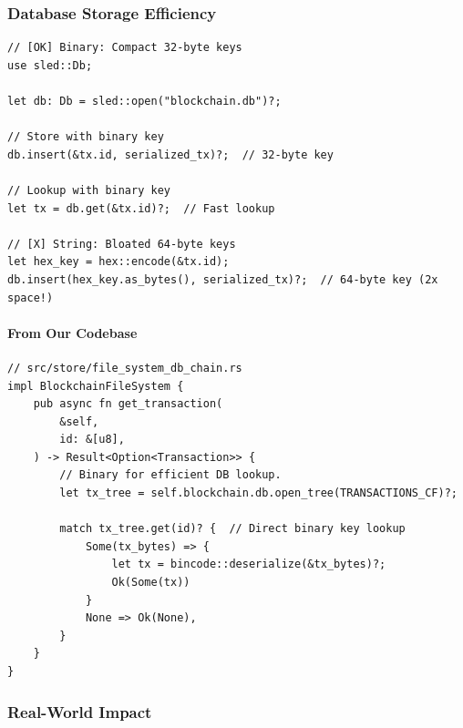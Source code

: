 \subsubsection{Database Storage Efficiency}
\label{sec:ch06-database-efficiency}

\begin{listing}[H]
\caption{Database key-value operations}
\label{lst:ch06-6}
\begin{verbatim}
// [OK] Binary: Compact 32-byte keys
use sled::Db;

let db: Db = sled::open("blockchain.db")?;

// Store with binary key
db.insert(&tx.id, serialized_tx)?;  // 32-byte key

// Lookup with binary key
let tx = db.get(&tx.id)?;  // Fast lookup

// [X] String: Bloated 64-byte keys
let hex_key = hex::encode(&tx.id);
db.insert(hex_key.as_bytes(), serialized_tx)?;  // 64-byte key (2x space!)
\end{verbatim}
\end{listing}

\paragraph{From Our Codebase}

\begin{listing}[H]
\caption{Database transaction lookup}
\label{lst:ch06-7}
\begin{verbatim}
// src/store/file_system_db_chain.rs
impl BlockchainFileSystem {
    pub async fn get_transaction(
        &self,
        id: &[u8],
    ) -> Result<Option<Transaction>> {
        // Binary for efficient DB lookup.
        let tx_tree = self.blockchain.db.open_tree(TRANSACTIONS_CF)?;

        match tx_tree.get(id)? {  // Direct binary key lookup
            Some(tx_bytes) => {
                let tx = bincode::deserialize(&tx_bytes)?;
                Ok(Some(tx))
            }
            None => Ok(None),
        }
    }
}
\end{verbatim}
\end{listing}

\subsubsection{Real-World Impact}
\label{sec:ch06-real-world-impact}

